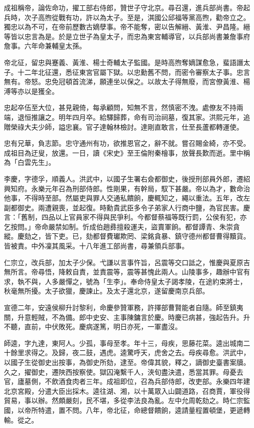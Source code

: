 \begin{pinyinscope}
成祖稱帝，論佐命功，擢工部右侍郎，贊世子守北京。尋召還，進兵部尚書。帝起兵時，次子高煦從戰有功，許以為太子。至是，淇國公邱福等黨高煦，勸帝立之。獨忠以為不可，在帝前歷數古嫡孽事。帝不能奪，密以告解縉、黃淮、尹昌隆。縉等皆以忠言為是。於是立世子為皇太子，而忠為東宮輔導官，以兵部尚書兼詹事府詹事。六年命兼輔皇太孫。

帝北征，留忠與蹇義、黃淮、楊士奇輔太子監國。是時高煦奪嫡謀愈急，蜚語譖太子。十二年北征還，悉征東宮官屬下獄。以忠勳舊不問，而密令審察太子事。忠言無有。帝怒。忠免冠頓首流涕，願連坐以保之。以故太子得無廢，而宮僚黃淮、楊溥等亦以是獲全。

忠起卒伍至大位，甚見親倚，每承顧問，知無不言，然慎密不洩。處僚友不持兩端，退恒推讓之。明年四月卒。給驛歸葬，命有司治祠墓，復其家。洪熙元年，追贈榮祿大夫少師，謚忠襄。官子達翰林檢討。達剛直敢言，仕至長蘆都轉運使。

忠有兄華，負志節。忠守通州有功，欲推恩官之，辭不就。嘗召賜金綺，亦不受。成祖目為迂叟，放還。一日，讀《宋史》至王倫附秦檜事，放聲長歎而逝。里中稱為「白雲先生」。

李慶，字德孚，順義人。洪武中，以國子生署右僉都御史，後授刑部員外郎，遷紹興知府。永樂元年召為刑部侍郎。性剛果，有幹局，馭下甚嚴。帝以為才，數命治他事，不得時至部。然屬吏與罪人交通私饋餉，慶輒知之，繩以重法。五年，改左副都御史。兩遭親喪，並起復。時勳貴武臣多令子弟家人行商中鹽，為官民害。慶言：「舊制，四品以上官員家不得與民爭利。今都督蔡福等既行罰，公侯有犯，亦乞按問。」帝命嚴禁如制。忻成伯趙彞擅殺運夫，盜賣軍餉。都督譚青、朱崇貪縱。慶劾之，皆下吏。已，劾都督費瓛欺罔、梁銘貪暴、鎮守德州都督曹得黷貨。皆被責。中外凜其風采。十八年進工部尚書，尋兼領兵部事。

仁宗立，改兵部，加太子少保。弋謙以言事忤旨，呂震等交口詆之，惟慶與夏原吉無所言。帝尋悟，降敕自責，並責震等，震等甚愧此兩人。山陵事多，趣辦中官有求，執不與，人多嚴憚之，號為「生李」。奉命侍皇太子謁孝陵，在途約束將士，秋毫無所擾。太子欲獵，慶諫止。及太子還北京，遂留慶南京兵部。

宣德二年，安遠侯柳升討黎利，命慶參贊軍務，許擇部曹賢能者自隨。師至鎮夷關，升意輕賊，不為備。郎中史安、主事陳鏞言於慶。時慶已病甚，強起告升。升不聽，直前，中伏敗死。慶病遂篤，明日亦死，一軍盡沒。

師逵，字九達，東阿人。少孤，事母至孝。年十三，母疾，思藤花菜。逵出城南二十餘里求得之。及歸，夜二鼓，遇虎。逵驚呼天，虎舍之去。母疾尋愈。洪武中，以國子生從御史出按事，為御史所劾，逮至。帝偉其貌，釋之，謫御史臺書案牘。久之，擢御史，遷陜西按察使。獄囚淹繫千人，浹旬盡決遣，悉當其罪。母憂去官，廬墓側，不飲酒食肉者三年。成祖即位，召為兵部侍郎，改吏部。永樂四年建北京宮殿，分遣大臣出採木。逵往湖、湘，以十萬眾入山闢道路，召商賈，軍役得貿易，事以辦。然頗嚴刻，民不堪，多從李法良為亂。左中允周乾劾之。時仁宗監國，以帝所特遣，置不問。八年，帝北征，命總督饋餉，逵請量程置頓堡，更遞轉輸。從之。


\end{pinyinscope}

